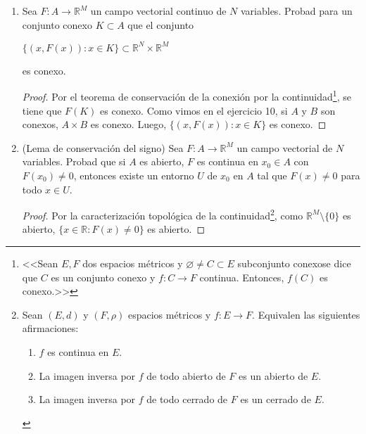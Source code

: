 \documentclass[a4paper, 11pt]{article} %
\let\emptyset\varnothing
\begin{document}
\begin{enumerate}
\begin{enumerate}[label=\alph*)]
\begin{proof}
			Tomando $\delta = \min\{\delta_i: \forall i = 1,2,\dots,N\}$, se cumple $\forall \varepsilon > 0$ $||F(x)-F(a)|| \le N \cdot ||f_m(x)-f_m(a)|| < \varepsilon$ siendo $m$ tal que $||f_m(x)-f_m(a)|| = \max \{||f_k(x)-f_k(a)||: k = 1,2,\dots,N\}$.
		\end{proof}
		\item $\lim\limits_{x \rightarrow a} F(x) = \beta = (\beta_1, \beta_2, \dots, \beta_M) \Leftrightarrow \lim\limits_{x \rightarrow a} f_k(x) = \beta_k \; \forall k = 1, 2, \dots, M$.
		\begin{proof}
			Incompleto.
			\fbox{$\Rightarrow$}\\
			\fbox{$\Leftarrow$}
		\end{proof}
	\end{enumerate}
	\item Sea $F: A \rightarrow \mathbb{R}^M$ un campo vectorial continuo de $N$ variables. Probad para un conjunto conexo $K \subset A$ que el conjunto
	\begin{center}
		$\{(x,F(x)): x \in K\} \subset \mathbb{R}^N \times \mathbb{R}^M$
	\end{center}
	es conexo.
	\begin{proof}
		Por el teorema de conservación de la conexión por la continuidad\footnote{<<Sean $E, F$ dos espacios métricos y $\emptyset \neq C \subset E$ subconjunto conexose dice que $C$ es un conjunto conexo y $f: C \rightarrow F$ continua. Entonces, $f(C)$ es conexo.>>}, se tiene que $F(K)$ es conexo.
		Como vimos en el ejercicio 10, si $A$ y $B$ son conexos, $A \times B$ es conexo.
		Luego, $\{(x,F(x)): x \in K\}$ es conexo.
	\end{proof}
	\item (Lema de conservación del signo) Sea $F:A \rightarrow \mathbb{R}^M$ un campo vectorial de $N$ variables. Probad que si $A$ es abierto, $F$ es continua en $x_0 \in A$ con $F(x_0) \neq 0$, entonces existe un entorno $U$ de $x_0$ en $A$ tal que $F(x) \neq 0$ para todo $x \in U$.
	\begin{proof}
		Por la caracterización topológica de la continuidad\footnote{Sean $(E, d)$ y $(F, \rho)$ espacios métricos y $f: E \rightarrow F$. Equivalen las siguientes afirmaciones:
		\begin{enumerate}[label=\alph*)]
			\item $f$ es continua en $E$.
			\item La imagen inversa por $f$ de todo abierto de $F$ es un abierto de $E$.
			\item La imagen inversa por $f$ de todo cerrado de $F$ es un cerrado de $E$.
		\end{enumerate}}, como $\mathbb{R}^M \setminus \{0\}$ es abierto, $\{x \in \mathbb{R}: F(x) \neq 0\}$ es abierto.
		

\end{proof}
\end{enumerate}
\end{document}
